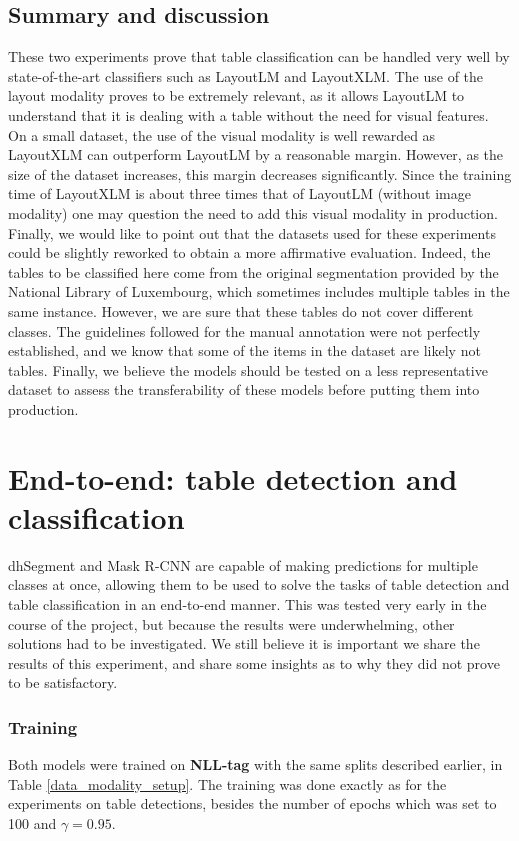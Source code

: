 \subsection{Summary and discussion}
These two experiments prove that table classification can be handled very well by state-of-the-art classifiers such as LayoutLM and LayoutXLM. The use of the layout modality proves to be extremely relevant, as it allows LayoutLM to understand that it is dealing with a table without the need for visual features. On a small dataset, the use of the visual modality is well rewarded as LayoutXLM can outperform LayoutLM by a reasonable margin. However, as the size of the dataset increases, this margin decreases significantly. Since the training time of LayoutXLM is about three times that of LayoutLM (without image modality) one may question the need to add this visual modality in production.\\
Finally, we would like to point out that the datasets used for these experiments could be slightly reworked to obtain a more affirmative evaluation. Indeed, the tables to be classified here come from the original segmentation provided by the National Library of Luxembourg, which sometimes includes multiple tables in the same instance. However, we are sure that these tables do not cover different classes. The guidelines followed for the manual annotation were not perfectly established, and we know that some of the items in the dataset are likely not tables. Finally, we believe the models should be tested on a less representative dataset to assess the transferability of these models before putting them into production.

\section{End-to-end: table detection and classification}
\label{end_to_end}
dhSegment and Mask R-CNN are capable of making predictions for multiple classes at once, allowing them to be used to solve the tasks of table detection and table classification in an end-to-end manner. This was tested very early in the course of the project, but because the results were underwhelming, other solutions had to be investigated. We still believe it is important we share the results of this experiment, and share some insights as to why they did not prove to be satisfactory.

\subsubsection{Training}
Both models were trained on \textbf{NLL-tag} with the same splits described earlier, in Table \ref{data_modality_setup}. The training was done exactly as for the experiments on table detections, besides the number of epochs which was set to 100 and $\gamma=0.95$.

